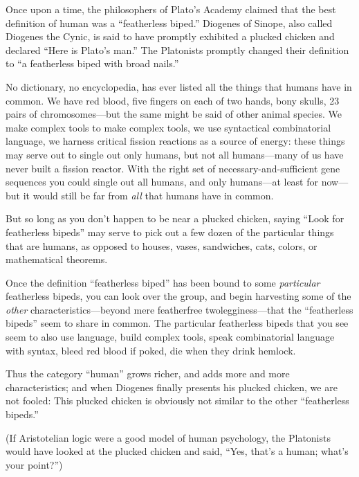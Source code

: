 {\myendsectiontext


\bigskip



 Once upon a time, the philosophers of Plato's
Academy claimed that the best definition of human was a
``featherless biped.'' Diogenes of
Sinope, also called Diogenes the Cynic, is said to have promptly
exhibited a plucked chicken and declared ``Here is
Plato's man.'' The Platonists
promptly changed their definition to ``a featherless
biped with broad nails.'' 


 No dictionary, no encyclopedia, has ever listed all the things
that humans have in common. We have red blood, five fingers on each of
two hands, bony skulls, 23 pairs of chromosomes---but the same might be
said of other animal species. We make complex tools to make complex
tools, we use syntactical combinatorial language, we harness critical
fission reactions as a source of energy: these things may serve out to
single out only humans, but not all humans---many of us have never
built a fission reactor. With the right set of necessary-and-sufficient
gene sequences you could single out all humans, and only humans---at
least for now---but it would still be far from \textit{all} that humans
have in common.


 But so long as you don't happen to be near a
plucked chicken, saying ``Look for featherless
bipeds'' may serve to pick out a few dozen of the
particular things that are humans, as opposed to houses, vases,
sandwiches, cats, colors, or mathematical theorems.


 Once the definition ``featherless
biped'' has been bound to some \textit{particular}
featherless bipeds, you can look over the group, and begin harvesting
some of the \textit{other} characteristics---beyond mere featherfree
twolegginess---that the ``featherless
bipeds'' seem to share in common. The particular
featherless bipeds that you see seem to also use language, build
complex tools, speak combinatorial language with syntax, bleed red
blood if poked, die when they drink hemlock.


 Thus the category ``human''
grows richer, and adds more and more characteristics; and when Diogenes
finally presents his plucked chicken, we are not fooled: This plucked
chicken is obviously not similar to the other
``featherless bipeds.''


 (If Aristotelian logic were a good model of human psychology, the
Platonists would have looked at the plucked chicken and said,
``Yes, that's a human;
what's your point?'')


}
